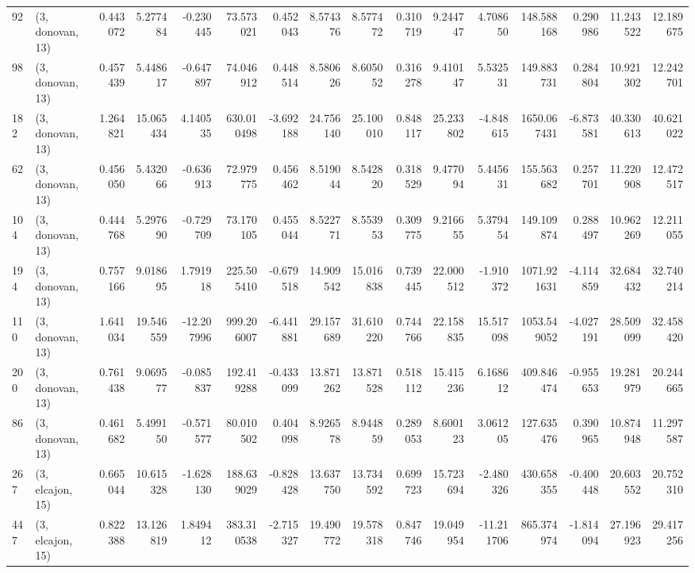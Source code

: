\begin{tabular}{llrrrrrrrrrrrrrr}
92  &  (3, donovan, 13) &   0.443072 &   5.277484 &  -0.230445 &    73.573021 &   0.452043 &   8.574376 &   8.577472 &  0.310719 &   9.244747 &   4.708650 &   148.588168 &   0.290986 &  11.243522 &  12.189675 \\
98  &  (3, donovan, 13) &   0.457439 &   5.448617 &  -0.647897 &    74.046912 &   0.448514 &   8.580626 &   8.605052 &  0.316278 &   9.410147 &   5.532531 &   149.883731 &   0.284804 &  10.921302 &  12.242701 \\
182 &  (3, donovan, 13) &   1.264821 &  15.065434 &   4.140535 &   630.010498 &  -3.692188 &  24.756140 &  25.100010 &  0.848117 &  25.233802 &  -4.848615 &  1650.067431 &  -6.873581 &  40.330613 &  40.621022 \\
62  &  (3, donovan, 13) &   0.456050 &   5.432066 &  -0.636913 &    72.979775 &   0.456462 &   8.519044 &   8.542820 &  0.318529 &   9.477094 &   5.445631 &   155.563682 &   0.257701 &  11.220908 &  12.472517 \\
104 &  (3, donovan, 13) &   0.444768 &   5.297690 &  -0.729709 &    73.170105 &   0.455044 &   8.522771 &   8.553953 &  0.309775 &   9.216655 &   5.379454 &   149.109874 &   0.288497 &  10.962269 &  12.211055 \\
194 &  (3, donovan, 13) &   0.757166 &   9.018695 &   1.791918 &   225.505410 &  -0.679518 &  14.909542 &  15.016838 &  0.739445 &  22.000512 &  -1.910372 &  1071.921631 &  -4.114859 &  32.684432 &  32.740214 \\
110 &  (3, donovan, 13) &   1.641034 &  19.546559 & -12.207996 &   999.206007 &  -6.441881 &  29.157689 &  31.610220 &  0.744766 &  22.158835 &  15.517098 &  1053.549052 &  -4.027191 &  28.509099 &  32.458420 \\
200 &  (3, donovan, 13) &   0.761438 &   9.069577 &  -0.085837 &   192.419288 &  -0.433099 &  13.871262 &  13.871528 &  0.518112 &  15.415236 &   6.168612 &   409.846474 &  -0.955653 &  19.281979 &  20.244665 \\
86  &  (3, donovan, 13) &   0.461682 &   5.499150 &  -0.571577 &    80.010502 &   0.404098 &   8.926578 &   8.944859 &  0.289053 &   8.600123 &   3.061205 &   127.635476 &   0.390965 &  10.874948 &  11.297587 \\
267 &  (3, elcajon, 15) &   0.665044 &  10.615328 &  -1.628130 &   188.639029 &  -0.828428 &  13.637750 &  13.734592 &  0.699723 &  15.723694 &  -2.480326 &   430.658355 &  -0.400448 &  20.603552 &  20.752310 \\
447 &  (3, elcajon, 15) &   0.822388 &  13.126819 &   1.849412 &   383.310538 &  -2.715327 &  19.490772 &  19.578318 &  0.847746 &  19.049954 & -11.211706 &   865.374974 &  -1.814094 &  27.196923 &  29.417256 \\

\end{tabular}
